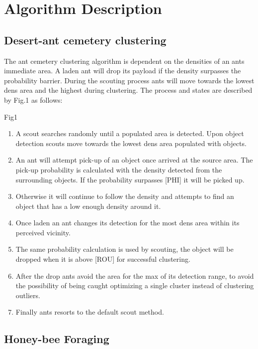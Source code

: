 \documentclass[12pt]{article}
\begin{document}
\section*{Algorithm Description}

\subsection*{Desert-ant cemetery clustering}

\par{The ant cemetery clustering algorithm is dependent on the densities of an ants immediate area. A laden ant will  drop its payload if the density surpasses the probability barrier. During the scouting process ants will move towards the lowest dens area and the highest during clustering. The process and states are described by Fig.1 as follows:}
\\
\par{Fig1}
\\
\begin{enumerate}[nolistsep]
\item A scout searches randomly until a populated area is detected. Upon object detection scouts move towards the lowest dens area populated with objects.
\item An ant will attempt pick-up of an object once arrived at the source area. The pick-up probability is calculated with the density detected from the surrounding objects. If the probability surpasses [PHI] it will be picked up.
\item Otherwise it will continue to follow the density and attempts to find an object that has a low enough density around it.
\item Once laden an ant changes its detection for the most dens area within its perceived vicinity.
\item The same probability calculation is used by scouting, the object will be dropped when it is above [ROU] for successful clustering.
\item After the drop ants avoid the area for the max of its detection range, to avoid the possibility of being caught optimizing a single cluster instead of clustering outliers.
\item Finally ants resorts to the default scout method.
\end{enumerate}

\subsection*{Honey-bee Foraging}
\end{document}
